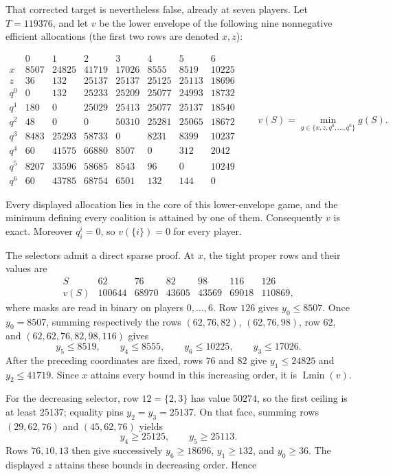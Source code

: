 \documentclass[11pt]{article}
\newcommand{\Lmin}{\operatorname{Lmin}}
\begin{document}
That corrected target is nevertheless false, already at seven players.
Let \(T=119376\), and let \(v\) be the lower envelope of the following nine
nonnegative efficient allocations (the first two rows are denoted \(x,z\)):

\[
\begin{array}{c|rrrrrrr}
 &0&1&2&3&4&5&6\\ \hline
x&8507&24825&41719&17026&8555&8519&10225\\
z&36&132&25137&25137&25125&25113&18696\\
q^0&0&132&25233&25209&25077&24993&18732\\
q^1&180&0&25029&25413&25077&25137&18540\\
q^2&48&0&0&50310&25281&25065&18672\\
q^3&8483&25293&58733&0&8231&8399&10237\\
q^4&60&41575&66880&8507&0&312&2042\\
q^5&8207&33596&58685&8543&96&0&10249\\
q^6&60&43785&68754&6501&132&144&0
\end{array}
\qquad
v(S)=\min_{g\in\{x,z,q^0,\ldots,q^6\}}g(S).            \tag{PXC143a}
\]

Every displayed allocation lies in the core of this lower-envelope game,
and the minimum defining every coalition is attained by one of them.
Consequently \(v\) is exact.  Moreover \(q^i_i=0\), so
\(v(\{i\})=0\) for every player.

The selectors admit a direct sparse proof.  At \(x\), the tight proper rows
and their values are
\[
\begin{array}{c|rrrrrr}
S&62&76&82&98&116&126\\ \hline
v(S)&100644&68970&43605&43569&69018&110869,
\end{array}                                             \tag{PXC143b}
\]
where masks are read in binary on players \(0,\ldots,6\).  Row \(126\)
gives \(y_0\le8507\).  Once \(y_0=8507\), summing respectively the rows
\((62,76,82)\), \((62,76,98)\), row \(62\), and
\((62,62,76,82,98,116)\) gives
\[
 y_5\le8519,\qquad y_4\le8555,\qquad y_6\le10225,\qquad
 y_3\le17026.
\]
After the preceding coordinates are fixed, rows \(76\) and \(82\) give
\(y_1\le24825\) and \(y_2\le41719\).  Since \(x\) attains every bound in
this increasing order, it is \(\Lmin(v)\).

For the decreasing selector, row \(12=\{2,3\}\) has value \(50274\), so
the first ceiling is at least \(25137\); equality pins
\(y_2=y_3=25137\).  On that face, summing rows \((29,62,76)\) and
\((45,62,76)\) yields
\[
 y_4\ge25125,\qquad y_5\ge25113.
\]
Rows \(76,10,13\) then give successively
\(y_6\ge18696\), \(y_1\ge132\), and \(y_0\ge36\).
The displayed \(z\) attains these bounds in decreasing order.  Hence
\end{document}
